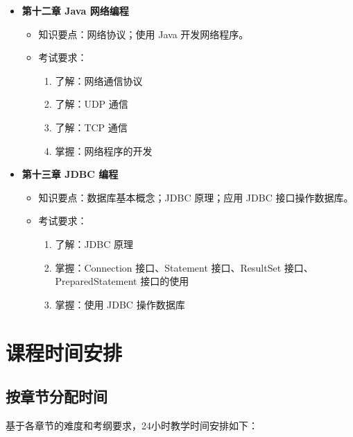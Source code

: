\documentclass{../note}
\begin{document}
\begin{itemize}
  \item \textbf{第十二章 Java 网络编程}
    \begin{itemize}
      \item 知识要点：网络协议；使用 Java 开发网络程序。
      \item 考试要求：
        \begin{enumerate}
          \item 了解：网络通信协议
          \item 了解：UDP 通信
          \item 了解：TCP 通信
          \item 掌握：网络程序的开发
        \end{enumerate}
    \end{itemize}

  \item \textbf{第十三章 JDBC 编程}
    \begin{itemize}
      \item 知识要点：数据库基本概念；JDBC 原理；应用 JDBC 接口操作数据库。
      \item 考试要求：
        \begin{enumerate}
          \item 了解：JDBC 原理
          \item 掌握：Connection 接口、Statement 接口、ResultSet 接口、PreparedStatement 接口的使用
          \item 掌握：使用 JDBC 操作数据库
        \end{enumerate}
    \end{itemize}
\end{itemize}

\section{课程时间安排}


\subsection{按章节分配时间}
基于各章节的难度和考纲要求，24小时教学时间安排如下：
\end{document}
